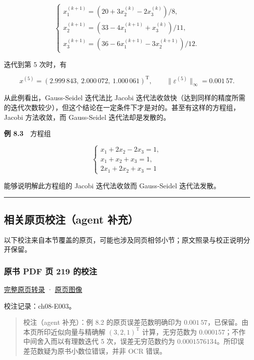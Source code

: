 \documentclass[
  10pt,
  fontset=fandol]{ctexart}
\begin{document}
\[
\begin{cases}
x_1^{(k+1)}=(20+3x_2^{(k)}-2x_3^{(k)})/8,\\
x_2^{(k+1)}=(33-4x_1^{(k+1)}+x_3^{(k)})/11,\\
x_3^{(k+1)}=(36-6x_1^{(k+1)}-3x_2^{(k+1)})/12.
\end{cases}
\]

迭代到第 5 次时，有

\[
x^{(5)}=(2.999\,843,\ 2.000\,072,\ 1.000\,061)^{\mathrm T},\qquad
\|\varepsilon^{(5)}\|_\infty=0.001\,57.
\]

从此例看出，Gauss-Seidel 迭代法比 Jacobi 迭代法收敛快（达到同样的精度所需的迭代次数较少），但这个结论在一定条件下才是对的。甚至有这样的方程组，Jacobi 方法收敛，而 Gauss-Seidel 迭代法却是发散的。

\textbf{例 8.3}　方程组

\[
\begin{cases}
x_1+2x_2-2x_3=1,\\
x_1+x_2+x_3=1,\\
2x_1+2x_2+x_3=1
\end{cases}
\]

能够说明解此方程组的 Jacobi 迭代法收敛而 Gauss-Seidel 迭代法发散。

\begin{center}\rule{0.5\linewidth}{0.5pt}\end{center}

\subsection{相关原页校注（agent 补充）}\label{ux76f8ux5173ux539fux9875ux6821ux6ce8agent-ux8865ux5145}

以下校注来自本节覆盖的原页，可能也涉及同页相邻小节；原文照录与校正说明分开保留。

\subsubsection{原书 PDF 页 219 的校注}\label{ux539fux4e66-pdf-ux9875-219-ux7684ux6821ux6ce8}

\href{../pages/pdf-219.md}{完整原页转录} · \href{../../source-images/pdf-219.jpeg}{原页图像}

校注记录：ch08-E003。

\begin{quote}
校注（agent 补充）：例 8.2 的原页误差范数明确印为 \(0.001\,57\)，已保留。由本页所印近似向量与精确解 \((3,2,1)^{\mathrm T}\) 计算，无穷范数为 \(0.000157\)；不作中间舍入而以有理数迭代 5 次，误差无穷范数约为 \(0.0001576134\)。所印误差范数疑为原书小数位错误，并非 OCR 错误。
\end{quote}
\end{document}
